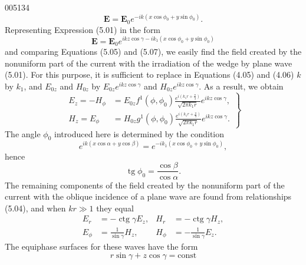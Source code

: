 \begin{scanpage}{0051}{34}
\[\mathbf E=\mathbf E_0e^{-ik(x\cos\phi_0+y\sin\phi_0)}.\tag{5.08}\]
Representing Expression (5.01) in the form
\[\mathbf E=\mathbf E_0e^{ikz\cos\gamma-ik_1(x\cos\phi_0+y\sin\phi_0)}\tag{5.09}\]
and comparing Equations (5.05) and (5.07), we easily find the field created by the nonuniform part of the current with the irradiation of the wedge by plane wave (5.01). For this purpose, it is sufficient to replace in Equations (4.05) and (4.06) $k$ by $k_1$, and $E_{0z}$ and $H_{0z}$ by $E_{0z}e^{ikz\cos\gamma}$ and $H_{0z}e^{ikz\cos\gamma}$. As a result, we obtain
\[\left.\begin{aligned}E_z=-H_\phi&=E_{0z}f^1(\phi,\phi_0)\frac{e^{i(k_1r+\frac\pi4)}}{\sqrt{2\pi k_1r}}e^{ikz\cos\gamma},\\H_z=E_\phi&=H_{0z}g^1(\phi,\phi_0)\frac{e^{i(k_1r+\frac\pi4)}}{\sqrt{2\pi k_1r}}e^{ikz\cos\gamma}.\end{aligned}\right\}\tag{5.10}\]
The angle $\phi_0$ introduced here is determined by the condition
\[e^{ik(x\cos\alpha+y\cos\beta)}=e^{-ik_1(x\cos\phi_0+y\sin\phi_0)},\tag{5.11}\]
hence
\[\operatorname{tg}\phi_0=\frac{\cos\beta}{\cos\alpha}.\tag{5.12}\]
The remaining components of the field created by the nonuniform part of the current with the oblique incidence of a plane wave are found from relationships (5.04), and when $kr\gg1$ they equal
\[\begin{aligned}E_r&=-\operatorname{ctg}\gamma E_z,&H_r&=-\operatorname{ctg}\gamma H_z,\\E_\phi&=\frac1{\sin\gamma}H_z,&H_\phi&=-\frac1{\sin\gamma}E_z.\end{aligned}\tag{5.13}\]
The equiphase surfaces for these waves have the form
\[r\sin\gamma+z\cos\gamma=\mathrm{const}\tag{5.14}\]
\end{scanpage}
